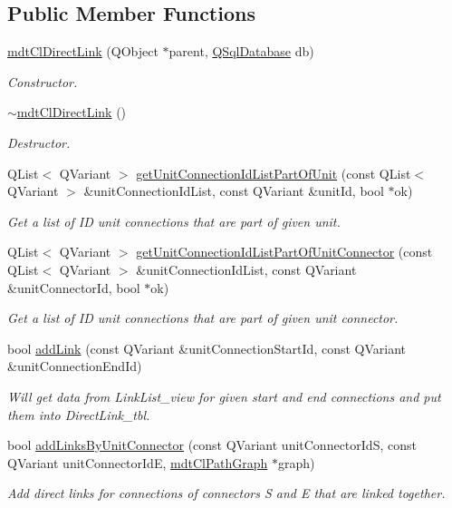 \subsection*{Public Member Functions}
\begin{DoxyCompactItemize}
\item 
\hyperlink{classmdt_cl_direct_link_a6a5a5512fdac07d478af18c3c99763fd}{mdt\-Cl\-Direct\-Link} (Q\-Object $\ast$parent, \hyperlink{class_q_sql_database}{Q\-Sql\-Database} db)
\begin{DoxyCompactList}\small\item\em Constructor. \end{DoxyCompactList}\item 
\hyperlink{classmdt_cl_direct_link_a4b6d24e71f1e9e4f5917176f6101c4a8}{$\sim$mdt\-Cl\-Direct\-Link} ()
\begin{DoxyCompactList}\small\item\em Destructor. \end{DoxyCompactList}\item 
Q\-List$<$ Q\-Variant $>$ \hyperlink{classmdt_cl_direct_link_a1922ecf2c70985461a2b20700404ef7e}{get\-Unit\-Connection\-Id\-List\-Part\-Of\-Unit} (const Q\-List$<$ Q\-Variant $>$ \&unit\-Connection\-Id\-List, const Q\-Variant \&unit\-Id, bool $\ast$ok)
\begin{DoxyCompactList}\small\item\em Get a list of I\-D unit connections that are part of given unit. \end{DoxyCompactList}\item 
Q\-List$<$ Q\-Variant $>$ \hyperlink{classmdt_cl_direct_link_acc3e005886f9dad09c9843df81b439e4}{get\-Unit\-Connection\-Id\-List\-Part\-Of\-Unit\-Connector} (const Q\-List$<$ Q\-Variant $>$ \&unit\-Connection\-Id\-List, const Q\-Variant \&unit\-Connector\-Id, bool $\ast$ok)
\begin{DoxyCompactList}\small\item\em Get a list of I\-D unit connections that are part of given unit connector. \end{DoxyCompactList}\item 
bool \hyperlink{classmdt_cl_direct_link_a800b3cee7ef1acbe9271e698d62e6bf8}{add\-Link} (const Q\-Variant \&unit\-Connection\-Start\-Id, const Q\-Variant \&unit\-Connection\-End\-Id)
\begin{DoxyCompactList}\small\item\em Will get data from Link\-List\-\_\-view for given start and end connections and put them into Direct\-Link\-\_\-tbl. \end{DoxyCompactList}\item 
bool \hyperlink{classmdt_cl_direct_link_aa7a155c3bf99b91e2d9cff85e93f332b}{add\-Links\-By\-Unit\-Connector} (const Q\-Variant unit\-Connector\-Id\-S, const Q\-Variant unit\-Connector\-Id\-E, \hyperlink{classmdt_cl_path_graph}{mdt\-Cl\-Path\-Graph} $\ast$graph)
\begin{DoxyCompactList}\small\item\em Add direct links for connections of connectors S and E that are linked together. \end{DoxyCompactList}\end{DoxyCompactItemize}
